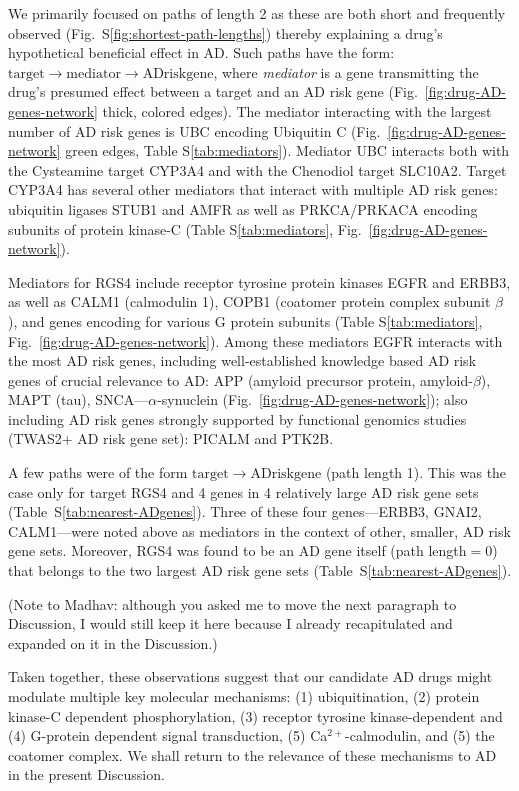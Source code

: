 \documentclass[letterpaper]{article}
\begin{document}
We primarily focused on paths of length 2 as these are both short and
frequently observed (Fig.~S\ref{fig:shortest-path-lengths}) thereby explaining
a drug's hypothetical beneficial effect in AD.  Such paths have the form:
$\mathrm{target} \rightarrow \mathrm{mediator} \rightarrow \mathrm{AD risk gene}$,
where \emph{mediator} is a gene transmitting the drug's presumed effect between a target
and an AD risk gene (Fig.~\ref{fig:drug-AD-genes-network} thick, colored edges).
The mediator interacting with the largest number of AD risk genes is UBC encoding Ubiquitin C
(Fig.~\ref{fig:drug-AD-genes-network} green edges, Table
S\ref{tab:mediators}). Mediator UBC interacts both with the Cysteamine target
CYP3A4 and with the Chenodiol target SLC10A2.  Target CYP3A4 has several
other mediators that interact with multiple AD risk genes: ubiquitin ligases STUB1
and AMFR as well as PRKCA/PRKACA encoding subunits of protein kinase-C
(Table S\ref{tab:mediators}, Fig.~\ref{fig:drug-AD-genes-network}).

Mediators for RGS4 include receptor tyrosine protein kinases EGFR and ERBB3,
as well as CALM1 (calmodulin 1), COPB1 (coatomer protein complex subunit
$\beta$), and genes encoding for various G protein subunits (Table
S\ref{tab:mediators}, Fig.~\ref{fig:drug-AD-genes-network}).  Among these
mediators EGFR interacts with the most AD risk genes, including well-established
knowledge based AD risk genes of crucial relevance to AD: APP (amyloid precursor
protein, amyloid-$\beta$), MAPT (tau), SNCA---$\alpha$-synuclein
(Fig.~\ref{fig:drug-AD-genes-network}); also including AD risk genes strongly
supported by functional genomics studies (TWAS2+ AD risk gene set): PICALM and
PTK2B.

A few paths were of the form $\mathrm{target} \rightarrow \mathrm{AD risk gene}$
(path length 1).  This was the case only for target RGS4 and 4 genes in 4
relatively large AD risk gene sets (Table~S\ref{tab:nearest-ADgenes}).  Three of
these four genes---ERBB3, GNAI2, CALM1---were noted above as mediators in the
context of other, smaller, AD risk gene sets.  Moreover, RGS4 was found to be an AD
gene itself (path length$=0$) that belongs to the two largest AD risk gene sets
(Table~S\ref{tab:nearest-ADgenes}).

(Note to Madhav: although you asked me to move the next paragraph to
Discussion, I would still keep it here because I already recapitulated and
expanded on it in the Discussion.)

Taken together, these observations suggest that our candidate AD drugs might modulate
multiple key molecular mechanisms: (1)
ubiquitination, (2) protein kinase-C dependent phosphorylation, (3) receptor
tyrosine kinase-dependent and (4) G-protein dependent signal transduction, (5)
Ca$^{2+}$-calmodulin, and (5) the coatomer complex.  We shall return to the
relevance of these mechanisms to AD in the present Discussion.
\end{document}
